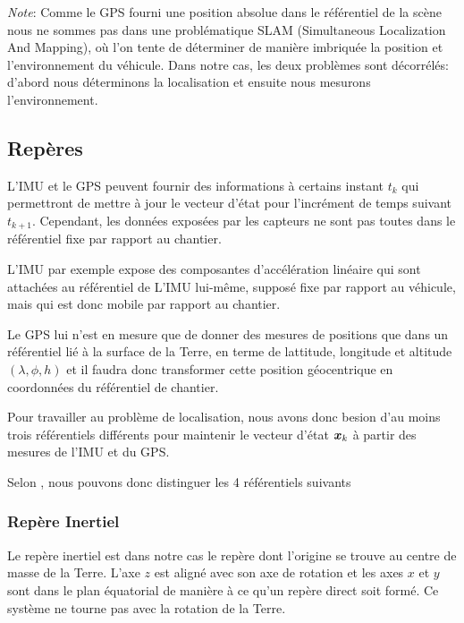 \documentclass[12pt,a4paper]{report}
\begin{document}
	\para \textit{Note}: Comme le GPS fourni une position absolue dans le référentiel de la scène nous ne sommes pas dans une problématique SLAM (Simultaneous Localization And Mapping), où l'on tente de déterminer de manière imbriquée la position et l'environnement du véhicule. Dans notre cas, les deux problèmes sont décorrélés: d'abord nous déterminons la localisation et ensuite nous mesurons l'environnement. 
	
	\subsection{Repères}
	
	\para L'IMU et le GPS peuvent fournir des informations à certains instant $t_k$ qui permettront de mettre à jour le vecteur d'état pour l'incrément de temps suivant $t_{k+1}$. Cependant, les données exposées par les capteurs ne sont pas toutes dans le référentiel fixe par rapport au chantier.
	
	\para L'IMU par exemple expose des composantes d'accélération linéaire qui sont attachées au référentiel de L'IMU lui-même, supposé fixe par rapport au véhicule, mais qui est donc mobile par rapport au chantier.
	
	\para Le GPS lui n'est en mesure que de donner des mesures de positions que dans un référentiel lié à la surface de la Terre, en terme de lattitude, longitude et altitude $(\lambda, \phi, h)$ et il faudra donc transformer cette position géocentrique en coordonnées du référentiel de chantier.
	
	\para Pour travailler au problème de localisation, nous avons donc besion d'au moins trois référentiels différents pour maintenir le vecteur d'état $\boldsymbol{x}_k$ à partir des mesures de l'IMU et du GPS.
	
	\para Selon \cite{gustavsson_uav_2015}, nous pouvons donc distinguer les 4 référentiels suivants
	
	\subsubsection{Repère Inertiel}
	Le repère inertiel est dans notre cas le repère dont l'origine se trouve au centre de masse de la Terre. L'axe $z$ est aligné avec son axe de rotation et les axes $x$ et $y$ sont dans le plan équatorial de manière à ce qu'un repère direct soit formé. Ce système ne tourne pas avec la rotation de la Terre.
	
\end{document}

